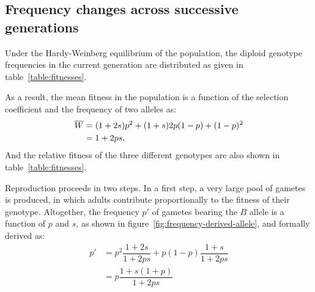 \subsection{Frequency changes across successive generations}

Under the Hardy-Weinberg equilibrium of the population, the diploid genotype frequencies in the current generation are distributed as given in table~\ref{table:fitnesses}.

As a result, the mean fitness in the population is a function of the selection coefficient and the frequency of two \glspl{allele} as:
\begin{align}
    \overline{W} &= (1+2s)p^2 + (1+s)2p(1-p) + (1-p)^2 \\
    &= 1 + 2ps,
\end{align}
And the relative fitness of the three different genotypes are also shown in table~\ref{table:fitnesses}.

\begin{table}[H]
    \centering
    \noindent{}
    \caption[Fitnesses of the different genotypes]{Fitnesses of the different genotypes}\label{table:fitnesses}
\end{table}

Reproduction proceeds in two steps.
In a first step, a very large pool of gametes is produced, in which adults contribute proportionally to the fitness of their genotype.
Altogether, the frequency $p'$ of gametes bearing the $B$ \gls{allele} is a function of $p$ and $s$, as shown in figure~\ref{fig:frequency-derived-allele}, and formally derived as:
\begin{align}
    p' & = p^2 \dfrac{1+2s}{1+2ps} + p (1-p)\dfrac{1+s}{1+2ps}\\
    & = p\dfrac{1+s(1+p)}{1 + 2ps}
\end{align}

